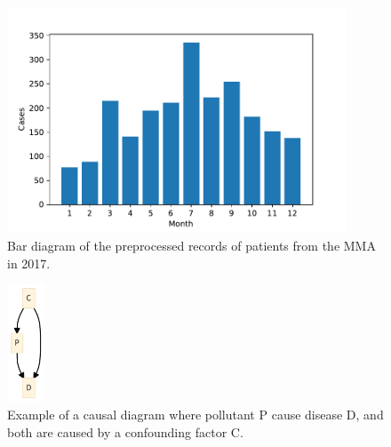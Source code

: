 \documentclass[
  11pt,
  a4paper,
  oneside
]{article}
\begin{document}
\begin{figure}
	\centering
        \includegraphics[width=0.9\textwidth]{figs/2017bymonth.pdf}
    \vspace*{-5mm}
	\caption{Bar diagram of the preprocessed records of patients from the MMA in 2017.}
	\label{fig:2017bymonth}
\end{figure}

\begin{figure}
    \centering
    \includegraphics[width=0.1\textwidth]{figs/causation_example.png}
    \caption{Example of a causal diagram where pollutant P cause disease D, and both are caused by a confounding factor C.}
    \label{fig:causation_example}
\end{figure}
\end{document}
